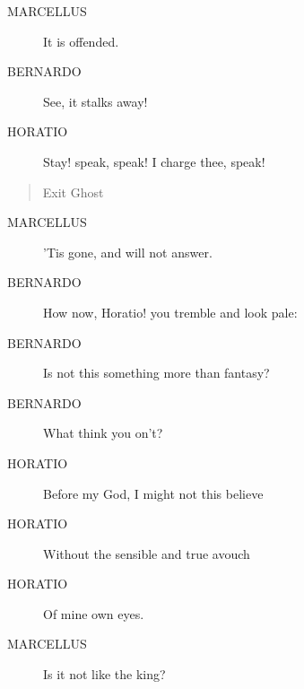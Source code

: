 \documentclass{article}
\begin{document}
\begin{description}
            
\item[MARCELLUS] It is offended.
\end{description}
          
\begin{description}
            
\item[BERNARDO] See, it stalks away!
\end{description}
          
\begin{description}
            
\item[HORATIO] Stay! speak, speak! I charge thee, speak!
\end{description}
          
\begin{quote}
Exit Ghost
\end{quote}
          
\begin{description}
            
\item[MARCELLUS] 'Tis gone, and will not answer.
\end{description}
          
\begin{description}
            
\item[BERNARDO] How now, Horatio! you tremble and look pale:
\item[BERNARDO] Is not this something more than fantasy?
\item[BERNARDO] What think you on't?
\end{description}
          
\begin{description}
            
\item[HORATIO] Before my God, I might not this believe
\item[HORATIO] Without the sensible and true avouch
\item[HORATIO] Of mine own eyes.
\end{description}
          
\begin{description}
            
\item[MARCELLUS] Is it not like the king?
\end{description}
          
\end{document}
